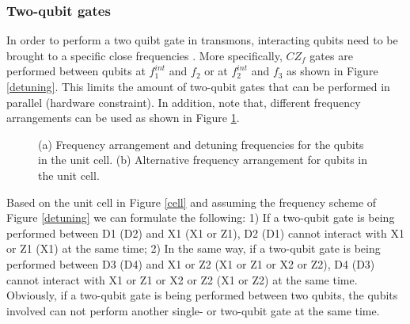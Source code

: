 \subsubsection{Two-qubit gates}

In order to perform a two quibt gate in transmons, interacting qubits need to be brought to a specific close frequencies \cite{versluis2016scalable}. More specifically, $CZ_f$ gates are performed between qubits at $f^{int}_1$ and $f_2$ or at $f^{int}_2$ and $f_3$ as shown in Figure \ref{detuning}. This limits the amount of two-qubit gates that can be performed in parallel (hardware constraint). In addition, note that, different frequency arrangements can be used as shown in Figure \ref{sequence}. 


\begin{figure}[h!]
\centerline{
}
\caption{(a) Frequency arrangement and detuning frequencies for the qubits in the unit cell. (b) Alternative frequency arrangement for qubits in the unit cell.}
\label{sequence}
\end{figure}


Based on the unit cell in Figure \ref{cell} and assuming the frequency scheme of Figure \ref{detuning} we can formulate the following: 1) If a two-qubit gate is being performed between D1 (D2) and X1 (X1 or Z1), D2 (D1) cannot interact with X1 or Z1 (X1) at the same time; 2) In the same way, if a two-qubit gate is being performed between D3 (D4) and X1 or Z2 (X1 or Z1 or X2 or Z2), D4 (D3) cannot interact with X1 or Z1 or X2 or Z2 (X1 or Z2) at the same time. Obviously,  if a two-qubit gate is being performed between two qubits, the qubits involved can not perform another single- or two-qubit gate at the same time.

